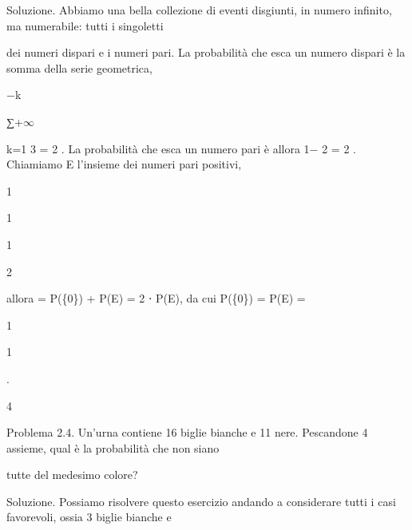 \documentclass[a4paper,portrait,12pt]{article}
\begin{document}
\begin{flushleft}
Soluzione. Abbiamo una bella collezione di eventi disgiunti, in numero infinito, ma numerabile: tutti i singoletti
\end{flushleft}


\begin{flushleft}
dei numeri dispari e i numeri pari. La probabilit\`{a} che esca un numero dispari \`{e} la somma della serie geometrica,
\end{flushleft}


\begin{flushleft}
$-$k
\end{flushleft}


∑+$\infty$


\begin{flushleft}
k=1 3 = 2 . La probabilit\`{a} che esca un numero pari \`{e} allora 1$-$ 2 = 2 . Chiamiamo E l'insieme dei numeri pari positivi,
\end{flushleft}


1





1





1


2





\begin{flushleft}
allora = P(\{0\}) + P(E) = 2 ⋅ P(E), da cui P(\{0\}) = P(E) =
\end{flushleft}





1





1


.


4





\begin{flushleft}
Problema 2.4. Un'urna contiene 16 biglie bianche e 11 nere. Pescandone 4 assieme, qual \`{e} la probabilit\`{a} che non siano
\end{flushleft}


\begin{flushleft}
tutte del medesimo colore?
\end{flushleft}


\begin{flushleft}
Soluzione. Possiamo risolvere questo esercizio andando a considerare tutti i casi favorevoli, ossia 3 biglie bianche e
\end{flushleft}
\end{document}
